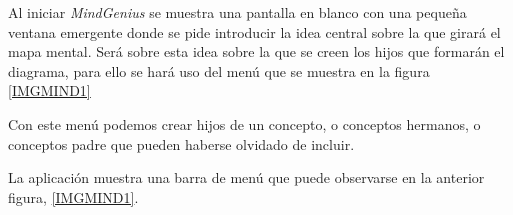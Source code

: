 \documentclass[11pt,a4paper,spanish,twoside]{report}
\begin{document}
        Al iniciar \emph{MindGenius} se muestra una pantalla en blanco con
        una pequeña ventana emergente donde se pide introducir la idea
        central sobre la que girará el mapa mental. Será sobre esta idea
        sobre la que se creen los hijos que formarán el diagrama, para ello
        se hará uso del menú que se muestra en la figura \ref{IMGMIND1}


        Con este menú podemos crear hijos de un concepto, o conceptos
        hermanos, o conceptos padre que pueden haberse olvidado de incluir.

        La aplicación muestra una barra de menú que puede observarse en la
        anterior figura, \ref{IMGMIND1}. 
        
\end{document}
